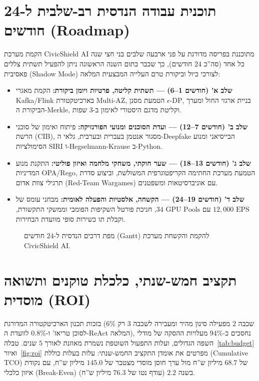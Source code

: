 \section{תוכנית עבודה הנדסית רב-שלבית ל-24 חודשים (Roadmap)}
\label{sec:roadmap}
הקמת מערכת \textenglish{CivicShield AI} מתוכננת בפריסה מדורגת על פני ארבעה שלבים בני חצי שנה כל אחד (סה''כ $24$ חודשים), כך שכבר בתום השנה הראשונה ניתן להפעיל תשתית צללים פאסיבית (\textenglish{Shadow Mode}) לצורכי כיול וביקורת טרם העלייה המבצעית המלאה:
\begin{itemize}
    \item \textbf{שלב א' (חודשים 1--6) --- תשתית קליטה, פרטיות ויומן ביקורת:} הקמת מאגרי \textenglish{Kafka/Flink} בארכיטקטורת \textenglish{Multi-AZ}, הטמעת מסנן $\epsilon$-\textenglish{DP}, בניית ארגזי החול ומערך הביקורת ה-\textenglish{Merkle}, וקליטת מדגם היסטורי לאימון ב-$3$ שפות.
    \item \textbf{שלב ב' (חודשים 7--12) --- ועדת הסוכנים ומנועי הפורנזיקה:} פיתוח ואימון של סוכני הרשת (\textenglish{CIB}), מסגור אנטמן בעברית ובערבית, גלאי ה-\textenglish{Deepfake} הבייסיאני ומנוע הסימולציות \textenglish{SIRI} ו-\textenglish{Hegselmann-Krause} ב-\textenglish{Python}.
    \item \textbf{שלב ג' (חודשים 13--18) --- שער חוקתי, משחקי מלחמה ואיזון פוליטי:} התקנת מנוע המדיניות \textenglish{OPA/Rego}, הטמעת מערכת החתימה הקריפטוגרפית המשולשת, וביצוע סדרת תרגילי צוות אדום (\textenglish{Red-Team Wargames}) עם אוניברסיטאות ומשפטנים.
    \item \textbf{שלב ד' (חודשים 19--24) --- הקשחה, אלסטיות והפעלה לאומית:} מבחני עומס של $12,000\text{ EPS}$ עם $34\text{ GPU Pools}$, חניכת פורטל השקיפות הפומבי וממשקי התקשורת, וקבלת תו כשירות סופי מוועדת הבחירות.
\end{itemize}

\begin{figure}[htbp]
    \centering
    
    \caption{מפת דרכים הנדסית ל-$24$ חודשים (\textenglish{Gantt}) להקמת והקשחת מערכת \textenglish{CivicShield AI}.}
    \label{fig:gantt}
\end{figure}

\section{תקציב חמש-שנתי, כלכלת טוקנים ותשואה מוסדית (ROI)}
\label{sec:budget}
בזכות תכנון הארכיטקטורה המדורגת (שכבה $2$ מפעילה סינון מהיר ומעבירה לשכבה $3$ רק $6\%$ לסוכן טריאז' ו-$0.8\%$ לוועדת ה-\textenglish{ReAct} המלאה), נחסכים כ-$94\%$ מעלויות ההסקה של מודלי השפה הגדולים, ועלות התפעול השוטפת נשמרת מאוזנת לאורך $5$ שנים. טבלה~\ref{tab:budget} ואיור~\ref{fig:roi} מפרטים את אומדן התקציב החמש-שנתי: עלות בעלות כוללת (\textenglish{Cumulative TCO}) של $68.7$ מיליון ש''ח מול ערך חוסן מוסדי מצטבר של $145.0$ מיליון ש''ח, עם נקודת איזון כלכלי (\textenglish{Break-Even}) בשנה $2.2$ (עודף נטו של $76.3$ מיליון ש''ח).

